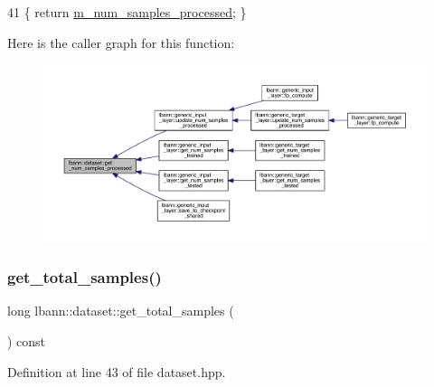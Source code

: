 \begin{DoxyCode}
41 \{ \textcolor{keywordflow}{return} \hyperlink{classlbann_1_1dataset_a68f4120cc4a7837e6a95b01358210cb5}{m\_num\_samples\_processed}; \}
\end{DoxyCode}
Here is the caller graph for this function\+:\nopagebreak
\begin{figure}[H]
\begin{center}
\leavevmode
\includegraphics[width=350pt]{classlbann_1_1dataset_a73496347a477a5ebb0dbf30140295026_icgraph}
\end{center}
\end{figure}
\mbox{\label{classlbann_1_1dataset_ad314847b347d413162a9d9eab759641f}} 
\subsubsection{\texorpdfstring{get\+\_\+total\+\_\+samples()}{get\_total\_samples()}}
{\footnotesize\ttfamily long lbann\+::dataset\+::get\+\_\+total\+\_\+samples (\begin{DoxyParamCaption}{ }\end{DoxyParamCaption}) const\hspace{0.3cm}{\ttfamily [inline]}}



Definition at line 43 of file dataset.\+hpp.


